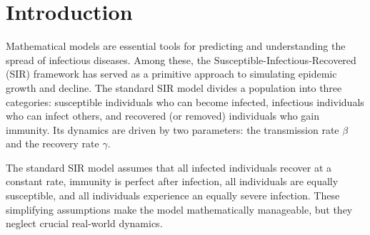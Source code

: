 \documentclass[10pt,twocolumn]{article}
\begin{document}

\section{Introduction}

Mathematical models are essential tools for predicting and understanding the spread of infectious diseases. Among these, the Susceptible-Infectious-Recovered (SIR) framework has served as a primitive approach to simulating epidemic growth and decline. The standard SIR model divides a population into three categories: susceptible individuals who can become infected, infectious individuals who can infect others, and recovered (or removed) individuals who gain immunity.
Its dynamics are driven by two parameters: the transmission rate $\beta$ and the recovery rate $\gamma$.

The standard SIR model assumes that all infected individuals recover at a constant rate, immunity is perfect after infection, all individuals are equally susceptible, and all individuals experience an equally severe infection. These simplifying assumptions make the model mathematically manageable, but they neglect crucial real-world dynamics.
\end{document}
